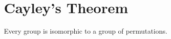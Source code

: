 \section{Cayley's Theorem}

\begin{theorem}
	Every group is isomorphic to a group of permutations.
\end{theorem}
